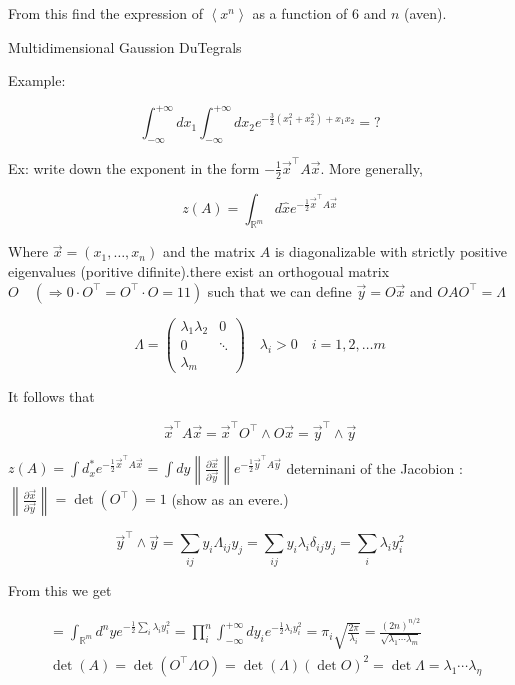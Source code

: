 From this find the expression of $\left\langle x^{n}\right\rangle$ as a function of 6 and $n$ (aven).

Multidimensional Gaussion DuTegrals

Example:

$$ 
\int_{-\infty}^{+\infty} d x_{1} \int_{-\infty}^{+\infty} d x_{2} e^{-\frac{3}{2}\left(x_{1}^{2}+x_{2}^{2}\right)+x_{1} x_{2}}=? 
$$ 

Ex: write down the exponent in the form $-\frac{1}{2} \vec{x}^{\top} A \vec{x}$.
More generally,

$$ 
z(A)=\int_{\mathbb{R}^{m}} d \hat{x} e^{-\frac{1}{2} \vec{x}^{\top} A \vec{x}} 
$$ 

Where $\vec{x}=\left(x_{1}, \ldots, x_{n}\right)$ and the matrix $A$ is diagonalizable with strictly positive eigenvalues (poritive difinite).\then there exist an orthogoual matrix $O \quad\left(\Rightarrow 0 \cdot O^{\top}=O^{\top} \cdot O=11\right)$ such that we can define $\vec{y}=O \vec{x}$ and $O A O^{\top}=\Lambda$

$$ 
\Lambda=\left(\begin{array}{cc}
\lambda_{1} \lambda_{2} & 0 \\ 0 & \ddots \\ 
\lambda_{m}
\end{array}\right) \quad \lambda_{i}>0 \quad i=1,2, \ldots m
$$ 

It follows that

$$ 
\vec{x}^{\top} A \vec{x}=\vec{x}^{\top} O^{\top} \wedge O \vec{x}=\vec{y}^{\top} \wedge \vec{y} 
$$ 

$z(A)=\int d_{x}^{*} e^{-\frac{1}{2} \vec{x}^{\top} A \vec{x}}=\int d y\left\|\frac{\partial \vec{x}}{\partial \vec{y}}\right\| e^{-\frac{1}{2} \vec{y}^{\top} A \vec{y}}$
deterninani of the Jacobion : $\left\|\frac{\partial \vec{x}}{\partial \vec{y}}\right\|=\operatorname{det}\left(O^{\top}\right)=1$ (show as an evere.)

$$ 
\vec{y}^{\top} \wedge \vec{y}=\sum_{i j} y_{i} \Lambda_{i j} y_{j}=\sum_{i j} y_{i} \lambda_{i} \delta_{i j} y_{j}=\sum_{i} \lambda_{i} y_{i}^{2} 
$$ 

From this we get

$$ 
\begin{aligned}
& =\int_{\mathbb{R}^{m}} d^{n} y e^{-\frac{1}{2} \sum_{i} \lambda_{i} y_{i}^{2}}=\prod_{i}^{n} \int_{-\infty}^{+\infty} d y_{i} e^{-\frac{1}{2} \lambda_{i} y_{i}^{2}}=\pi_{i} \sqrt{\frac{2 \pi}{\lambda_{i}}}=\frac{(2 n)^{n / 2}}{\sqrt{\lambda_{1} \cdots \lambda_{m}}} \\ 
& \operatorname{det}(A)=\operatorname{det}\left(O^{\top} \Lambda O\right)=\operatorname{det}(\Lambda)(\operatorname{det} O)^{2}=\operatorname{det} \Lambda=\lambda_{1} \cdots \lambda_{\eta}
\end{aligned}
$$ 

